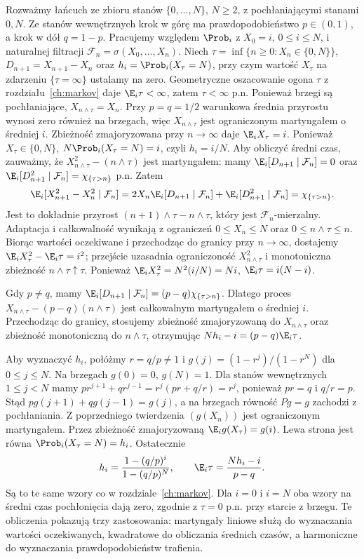 \begin{przyklad}
Rozważmy łańcuch ze zbioru stanów $\{0,\ldots,N\}$,
$N\geq2$, z pochłaniającymi stanami $0,N$.
Ze stanów wewnętrznych krok w górę ma
prawdopodobieństwo $p\in(0,1)$, a krok w dół $q=1-p$.
Pracujemy względem $\Prob_i$ z $X_0=i$,
$0\leq i\leq N$, i naturalnej filtracji $\mathcal F_n=\sigma(X_0,\ldots,X_n)$.
Niech $\tau=\inf\{n\geq0:X_n\in\{0,N\}\}$,
$D_{n+1}=X_{n+1}-X_n$ oraz
$h_i=\Prob_i(X_\tau=N)$, przy czym
wartość $X_\tau$ na zdarzeniu $\{\tau=\infty\}$
ustalamy na zero.
Geometryczne oszacowanie ogona $\tau$ z
rozdziału~\ref{ch:markov} daje $\E_i\tau<\infty$,
zatem $\tau<\infty$ p.n. Ponieważ brzegi są
pochłaniające, $X_{n\wedge\tau}=X_n$.
Przy $p=q=1/2$ warunkowa średnia przyrostu
wynosi zero również na brzegach, więc
$X_{n\wedge\tau}$ jest ograniczonym martyngałem
o średniej $i$. Zbieżność zmajoryzowana
przy $n\to\infty$ daje $\E_iX_\tau=i$. Ponieważ $X_\tau\in\{0,N\}$,
$N\Prob_i(X_\tau=N)=i$, czyli $h_i=i/N$.
Aby obliczyć średni czas, zauważmy, że
$X_{n\wedge\tau}^2-(n\wedge\tau)$ jest
martyngałem: mamy
$\E_i[D_{n+1}\mid\mathcal F_n]=0$ oraz
$\E_i[D_{n+1}^2\mid\mathcal F_n]=\chi_{\{\tau>n\}}$
p.n. Zatem
\[
\E_i[X_{n+1}^2-X_n^2\mid\mathcal F_n]
=2X_n\E_i[D_{n+1}\mid\mathcal F_n]
+\E_i[D_{n+1}^2\mid\mathcal F_n]
=\chi_{\{\tau>n\}}.
\]
Jest to dokładnie przyrost
$(n+1)\wedge\tau-n\wedge\tau$, który jest
$\mathcal F_n$-mierzalny. Adaptacja i całkowalność
wynikają z ograniczeń $0\leq X_n\leq N$
oraz $0\leq n\wedge\tau\leq n$.
Biorąc wartości oczekiwane i przechodząc do
granicy przy $n\to\infty$, dostajemy
$\E_i X_\tau^2-\E_i\tau=i^2$;
przejście uzasadnia ograniczoność $X_{n\wedge\tau}^2$
i monotoniczna zbieżność $n\wedge\tau\uparrow\tau$.
Ponieważ $\E_iX_\tau^2=N^2(i/N)=Ni$,
$\E_i\tau=i(N-i)$.

Gdy $p\ne q$, mamy
$\E_i[D_{n+1}\mid\mathcal F_n]=(p-q)\chi_{\{\tau>n\}}$.
Dlatego proces $X_{n\wedge\tau}-(p-q)(n\wedge\tau)$
jest całkowalnym martyngałem o średniej $i$.
Przechodząc do granicy, stosujemy zbieżność
zmajoryzowaną do $X_{n\wedge\tau}$ oraz
zbieżność monotoniczną do $n\wedge\tau$,
otrzymując $Nh_i-i=(p-q)\E_i\tau$.

Aby wyznaczyć $h_i$, połóżmy $r=q/p\ne1$ i
$g(j)=(1-r^j)/(1-r^N)$ dla $0\leq j\leq N$.
Na brzegach $g(0)=0$, $g(N)=1$.
Dla stanów wewnętrznych $1\leq j<N$
mamy $pr^{j+1}+qr^{j-1}=r^j(pr+q/r)=r^j$,
ponieważ $pr=q$ i $q/r=p$.
Stąd $pg(j+1)+qg(j-1)=g(j)$, a na brzegach
równość $Pg=g$ zachodzi z pochłaniania.
Z poprzedniego twierdzenia $(g(X_n))$ jest
ograniczonym martyngałem. Przez zbieżność
zmajoryzowaną $\E_i g(X_\tau)=g(i)$.
Lewa strona jest równa $\Prob_i(X_\tau=N)=h_i$.
Ostatecznie
\[
h_i=\frac{1-(q/p)^i}{1-(q/p)^N},\qquad
\E_i\tau=\frac{Nh_i-i}{p-q}.
\]
Są to te same wzory co w rozdziale~\ref{ch:markov}.
Dla $i=0$ i $i=N$ oba wzory na średni czas
pochłonięcia dają zero, zgodnie z $\tau=0$
p.n. przy starcie z brzegu.
Te obliczenia pokazują trzy zastosowania: martyngały liniowe
służą do wyznaczania wartości oczekiwanych, kwadratowe
do obliczania średnich czasów, a harmoniczne do
wyznaczania prawdopodobieństw trafienia.
\end{przyklad}



